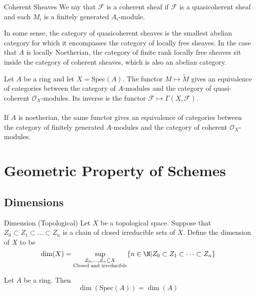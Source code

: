 \documentclass[a4paper]{article}
\begin{document}
\begin{defn}{Coherent Sheaves}{} We say that $\mathcal{F}$ is a coherent sheaf if $\mathcal{F}$ is a quasicoherent sheaf and each $M_i$ is a finitely generated $A_i$-module. 
\end{defn}

In some sense, the category of quasicoherent sheaves is the smallest abelian category for which it encompasses the category of locally free sheaves. In the case that $A$ is locally Noetherian, the category of finite rank locally free sheaves sit inside the category of coherent sheaves, which is also an abelian category. 

\begin{prp}{}{} Let $A$ be a ring and let $X=\text{Spec}(A)$. The functor $M\mapsto\tilde{M}$ gives an equivalence of categories between the category of $A$-modules and the category of quasi-coherent $\mathcal{O}_X$-modules. Its inverse is the functor $\mathcal{F}\mapsto\Gamma(X,\mathcal{F})$. \\~\\
If $A$ is noetherian, the same functor gives an equivalence of categories between the category of finitely generated $A$-modules and the category of coherent $\mathcal{O}_X$-modules. 
\end{prp}












\pagebreak
\section{Geometric Property of Schemes}
\subsection{Dimensions}
\begin{defn}{Dimension (Topological)}{} Let $X$ be a topological space. Suppose that $Z_0\subset Z_1\subset\dots\subset Z_n$ is a chain of closed irreducible sets of $X$. Define the dimension of $X$ to be $$\dim(X)=\sup_{\substack{Z_0,\dots,Z_n\subseteq X\\\text{Closed and irreducible}}}\{n\in\N|Z_0\subset Z_1\subset\dots\subset Z_n\}$$
\end{defn}



\begin{prp}{}{} Let $A$ be a ring. Then $$\dim(\text{Spec}(A))=\dim(A)$$
\end{prp}
\end{document}

